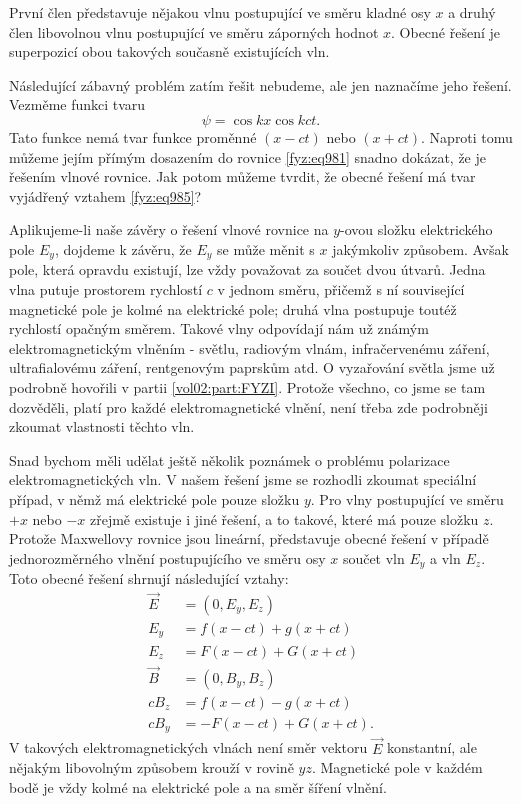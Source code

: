     První člen představuje nějakou vlnu postupující ve směru kladné osy \(x\) a druhý člen
    libovolnou vlnu postupující ve směru záporných hodnot \(x\). Obecné řešení je superpozicí obou
    takových současně existujících vln.
    
    Následující zábavný problém zatím řešit nebudeme, ale jen naznačíme jeho řešení. Vezměme funkci
    tvaru
    \begin{equation*}
      \psi=\cos kx\cos kct.
    \end{equation*}
    Tato funkce nemá tvar funkce proměnné \((x - ct)\) nebo \((x + ct)\). Naproti tomu můžeme jejím
    přímým dosazením do rovnice \eqref{fyz:eq981} snadno dokázat, že je řešením vlnové rovnice. Jak
    potom můžeme tvrdit, že obecné řešení má tvar vyjádřený vztahem \eqref{fyz:eq985}?
    
    Aplikujeme-li naše závěry o řešení vlnové rovnice na \(y\)-ovou složku elektrického pole
    \(E_y\), dojdeme k závěru, že \(E_y\) se může měnit s \(x\) jakýmkoliv způsobem. Avšak pole,
    která opravdu existují, lze vždy považovat za součet dvou útvarů. Jedna vlna putuje prostorem
    rychlostí \(c\) v jednom směru, přičemž s ní související magnetické pole je kolmé na elektrické
    pole; druhá vlna postupuje toutéž rychlostí opačným směrem. Takové vlny odpovídají nám už známým
    elektromagnetickým vlněním - světlu, radiovým vlnám, infračervenému záření, ultrafialovému
    záření, rentgenovým paprskům atd. O vyzařování světla jsme už podrobně hovořili v partii
    \ref{vol02:part:FYZI}. Protože všechno, co jsme se tam dozvěděli, platí pro každé elektromagnetické
    vlnění, není třeba zde podrobněji zkoumat vlastnosti těchto vln.
    
    Snad bychom měli udělat ještě několik poznámek o problému polarizace elektromagnetických vln. V
    našem řešení jsme se rozhodli zkoumat speciální případ, v němž má elektrické pole pouze složku
    \(y\). Pro vlny postupující ve směru \(+x\) nebo \(-x\) zřejmě existuje i jiné řešení, a to
    takové, které má pouze složku \(z\). Protože Maxwellovy rovnice jsou lineární, představuje
    obecné řešení v případě jednorozměrného vlnění postupujícího ve směru osy \(x\) součet vln
    \(E_y\) a vln \(E_z\). Toto obecné řešení shrnují následující vztahy:
    \begin{equation}\label{fyz:eq986}
      \begin{aligned}
        \vec{E}   &=(0,E_y,E_z)            \\[.5ex]
        E_y       &=f(x-ct)+g(x+ct)        \\[.5ex]
        E_z       &=F(x-ct)+G(x+ct)        \\[1ex]
        \vec{B}   &=(0,B_y,B_z)            \\[.5ex]
        cB_z      &=f(x-ct)-g(x+ct)        \\[.5ex]
        cB_y      &=-F(x-ct)+G(x+ct).
      \end{aligned}
    \end{equation}
    V takových elektromagnetických vlnách není směr vektoru \(\vec{E}\) konstantní, ale nějakým
    libovolným způsobem krouží v rovině \(yz\). Magnetické pole v každém bodě je vždy kolmé na
    elektrické pole a na směr šíření vlnění.
    
